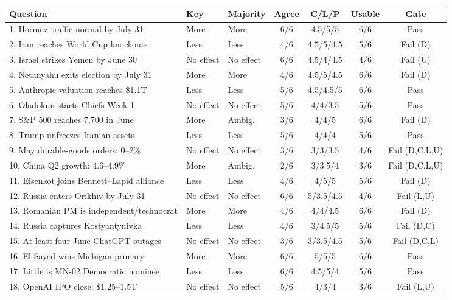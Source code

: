 \begin{tabular}{@{}p{.38\linewidth}llcccc@{}}
\toprule
Question & Key & Majority & Agree & C/L/P & Usable & Gate \\
\midrule
1. Hormuz traffic normal by July 31 & More & More & 6/6 & 4.5/5/5 & 6/6 & Pass \\
2. Iran reaches World Cup knockouts & Less & Less & 4/6 & 4.5/5/4.5 & 5/6 & Fail (D) \\
3. Israel strikes Yemen by June 30 & No effect & No effect & 6/6 & 4.5/4/4.5 & 4/6 & Fail (U) \\
4. Netanyahu exits election by July 31 & More & More & 4/6 & 4.5/5/4.5 & 6/6 & Fail (D) \\
5. Anthropic valuation reaches \$1.1T & Less & Less & 5/6 & 4.5/4.5/5 & 6/6 & Pass \\
6. Oladokun starts Chiefs Week 1 & No effect & No effect & 5/6 & 4/4/3.5 & 5/6 & Pass \\
7. S\&P 500 reaches 7,700 in June & More & Ambig. & 3/6 & 4/4/5 & 6/6 & Fail (D) \\
8. Trump unfreezes Iranian assets & Less & Less & 5/6 & 4/4/4 & 5/6 & Pass \\
9. May durable-goods orders: 0--2\% & No effect & No effect & 3/6 & 3/3/3.5 & 4/6 & Fail (D,C,L,U) \\
10. China Q2 growth: 4.6--4.9\% & More & Ambig. & 2/6 & 3/3.5/4 & 3/6 & Fail (D,C,L,U) \\
11. Eisenkot joins Bennett--Lapid alliance & Less & Less & 4/6 & 4/5/5 & 5/6 & Fail (D) \\
12. Russia enters Orikhiv by July 31 & No effect & No effect & 6/6 & 5/3.5/4.5 & 4/6 & Fail (L,U) \\
13. Romanian PM is independent/technocrat & More & More & 4/6 & 4/4/4.5 & 6/6 & Fail (D) \\
14. Russia captures Kostyantynivka & Less & Less & 4/6 & 3/4.5/5 & 5/6 & Fail (D,C) \\
15. At least four June ChatGPT outages & No effect & No effect & 3/6 & 3/3.5/4.5 & 5/6 & Fail (D,C,L) \\
16. El-Sayed wins Michigan primary & More & More & 6/6 & 5/5/5 & 6/6 & Pass \\
17. Little is MN-02 Democratic nominee & Less & Less & 6/6 & 4.5/5/4 & 5/6 & Pass \\
18. OpenAI IPO close: \$1.25--1.5T & No effect & No effect & 5/6 & 4/3/4 & 3/6 & Fail (L,U) \\
\bottomrule
\end{tabular}
